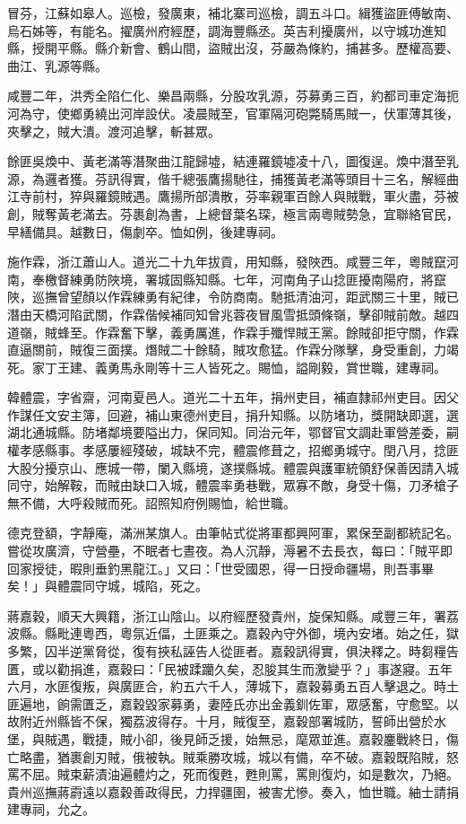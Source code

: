 \begin{pinyinscope}
冒芬，江蘇如皋人。巡檢，發廣東，補北寨司巡檢，調五斗口。緝獲盜匪傅敏南、烏石姊等，有能名。擢廣州府經歷，調海豐縣丞。英吉利擾廣州，以守城功進知縣，授開平縣。縣介新會、鶴山間，盜賊出沒，芬嚴為條約，捕甚多。歷權高要、曲江、乳源等縣。

咸豐二年，洪秀全陷仁化、樂昌兩縣，分股攻乳源，芬募勇三百，約都司車定海扼河為守，使鄉勇繞出河岸設伏。凌晨賊至，官軍隔河砲斃騎馬賊一，伏軍薄其後，夾擊之，賊大潰。渡河追擊，斬甚眾。

餘匪吳煥中、黃老滿等潛聚曲江龍歸墟，結連羅鏡墟凌十八，圖復逞。煥中潛至乳源，為邏者獲。芬訊得實，偕千總張鷹揚馳往，捕獲黃老滿等頭目十三名，解經曲江寺前村，猝與羅鏡賊遇。鷹揚所部潰散，芬率親軍百餘人與賊戰，軍火盡，芬被創，賊奪黃老滿去。芬裹創為書，上總督葉名琛，極言兩粵賊勢急，宜聯絡官民，早繕備具。越數日，傷劇卒。恤如例，後建專祠。

施作霖，浙江蕭山人。道光二十九年拔貢，用知縣，發陜西。咸豐三年，粵賊竄河南，奉檄督練勇防陜境，署城固縣知縣。七年，河南角子山捻匪擾南陽府，將竄陜，巡撫曾望顏以作霖練勇有紀律，令防商南。馳抵清油河，距武關三十里，賊已潛由天橋河陷武關，作霖偕候補同知曾兆蓉夜冒風雪抵頭條嶺，擊卻賊前敵。越四道嶺，賊蜂至。作霖奮下擊，義勇厲進，作霖手殲悍賊王黨。餘賊卻拒守關，作霖直逼關前，賊復三面撲。熸賊二十餘騎，賊攻愈猛。作霖分隊擊，身受重創，力竭死。家丁王建、義勇馬永剛等十三人皆死之。賜恤，謚剛毅，賞世職，建專祠。

韓體震，字省齋，河南夏邑人。道光二十五年，捐州吏目，補直隸祁州吏目。因父作謀任文安主簿，回避，補山東德州吏目，捐升知縣。以防堵功，獎開缺即選，選湖北通城縣。防堵鄰境要隘出力，保同知。同治元年，鄂督官文調赴軍營差委，嗣權孝感縣事。孝感屢經殘破，城缺不完，體震修葺之，招鄉勇城守。閏八月，捻匪大股分擾京山、應城一帶，闌入縣境，遂撲縣城。體震與護軍統領舒保善因請入城同守，始解鞍，而賊由缺口入城，體震率勇巷戰，眾寡不敵，身受十傷，刀矛槍子無不備，大呼殺賊而死。詔照知府例賜恤，給世職。

德克登額，字靜庵，滿洲某旗人。由筆帖式從將軍都興阿軍，累保至副都統記名。嘗從攻廣濟，守營壘，不眠者七晝夜。為人沉靜，溽暑不去長衣，每曰：「賊平即回家授徒，暇則垂釣黑龍江。」又曰：「世受國恩，得一日授命疆場，則吾事畢矣！」與體震同守城，城陷，死之。

蔣嘉穀，順天大興籍，浙江山陰山。以府經歷發貴州，旋保知縣。咸豐三年，署荔波縣。縣毗連粵西，粵氛近偪，土匪乘之。嘉穀內守外御，境內安堵。始之任，獄多繁，囚半逆黨脅從，復有挾私誣告人從匪者。嘉穀訊得實，俱決釋之。時芻糧告匱，或以勸捐進，嘉穀曰：「民被蹂躪久矣，忍朘其生而激變乎？」事遂寢。五年六月，水匪復叛，與廣匪合，約五六千人，薄城下，嘉穀募勇五百人擊退之。時土匪遍地，餉需匱乏，嘉穀毀家募勇，妻陸氏亦出金義釧佐軍，眾感奮，守愈堅。以故附近州縣皆不保，獨荔波得存。十月，賊復至，嘉穀部署城防，誓師出營於水堡，與賊遇，戰捷，賊小卻，後見師乏援，始無忌，麾眾並進。嘉穀鏖戰終日，傷亡略盡，猶裹創刃賊，俄被執。賊乘勝攻城，城以有備，卒不破。嘉穀既陷賊，怒罵不屈。賊束薪漬油遍體灼之，死而復甦，甦則罵，罵則復灼，如是數次，乃絕。貴州巡撫蔣霨遠以嘉穀善政得民，力捍疆圉，被害尤慘。奏入，恤世職。紬士請捐建專祠，允之。


\end{pinyinscope}
